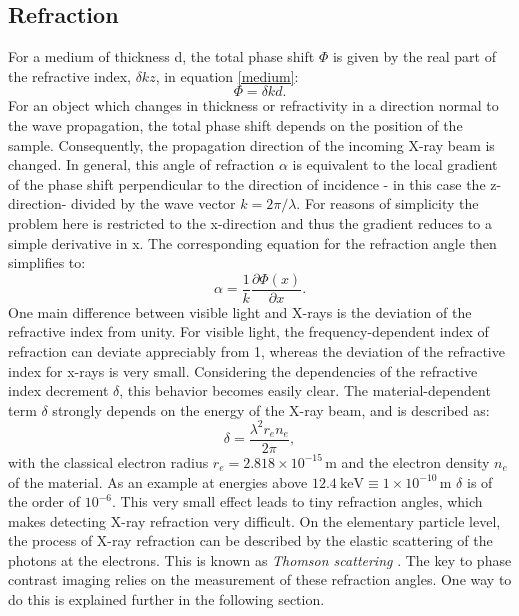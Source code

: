 \subsection{Refraction}\label{subsec:ref}
For a medium of thickness d, the total phase shift $\Phi$ is given by the real part of the refractive index, $\delta kz$, in equation \ref{medium}:
\begin{equation}
\Phi = \delta kd.
\end{equation}
For an object which changes in thickness or refractivity in a direction normal to the wave propagation, the total phase shift depends on the position of the sample. Consequently, the propagation direction of the incoming X-ray beam is changed. In general, this angle of refraction $\alpha$ is equivalent to the local gradient of the phase shift perpendicular to the direction of incidence - in this case the z-direction- divided by the wave vector $k = 2\pi /\lambda$. For reasons of simplicity the problem here is restricted to the x-direction and thus the gradient reduces to a simple derivative in x. The corresponding equation for the refraction angle then simplifies to:
\begin{equation}\label{refrangle}
\alpha = \frac{1}{k}\frac{\partial\Phi(x)}{\partial x}.
\end{equation}
\clearpage 
One main difference between visible light and X-rays is the deviation of the refractive index from unity. For visible light, the frequency-dependent index of refraction can deviate appreciably from 1, whereas the deviation of the refractive index for x-rays is very small. 
Considering the dependencies of the refractive index decrement $\delta$, this behavior becomes easily clear. The material-dependent term $\delta$ strongly depends on the energy of the X-ray beam, and is described as:
\begin{equation}
\delta= \frac{\lambda^{2}r_{e}n_{e}}{2\pi},
\end{equation}
with the classical electron radius $r_{e} = 2.818 \times 10^{-15}\,$m and the electron density $n_{e}$ of the material. As an example at energies above $12.4\ \text{keV} \equiv  1 \times 10^{-10}\,$m $\delta $ is of the order of $ 10^{-6}$. This very small effect leads to tiny refraction angles, which makes detecting X-ray refraction very difficult. On the elementary particle level, the process of X-ray refraction can be described by the elastic scattering of the photons at the electrons. This is known as \textit{Thomson scattering} \citep{Als-nielsen}. The key to phase contrast imaging relies on the measurement of these refraction angles. One way to do this is explained further in the following section.      
